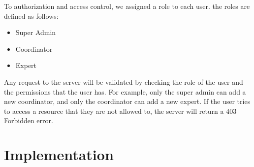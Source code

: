 To authorization and access control, we assigned a role to each user. the roles are defined as follows:
\begin{itemize}
    \item Super Admin
    \item Coordinator
    \item Expert
\end{itemize}

Any request to the server will be validated by checking the role of the user and the permissions that the user has.
For example, only the super admin can add a new coordinator, and only the coordinator can add a new expert.
If the user tries to access a resource that they are not allowed to, the server will return a 403 Forbidden error.


\section{Implementation}

